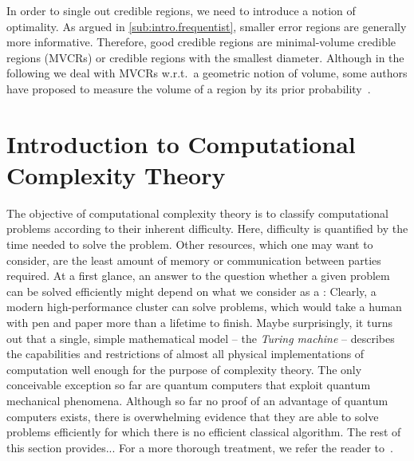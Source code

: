 In order to single out  credible regions, we need to introduce a notion of optimality.
As argued in \cref{sub:intro.frequentist}, smaller error regions are generally more informative.
Therefore, good credible regions are minimal-volume credible regions (MVCRs) or credible regions with the smallest diameter.
Although in the following we deal with MVCRs w.r.t.\ a geometric notion of volume, some authors have proposed to measure the volume of a region by its prior probability~\cite{Evans_2006_Optimally,Shang_2013_Optimal}.






\section{Introduction to Computational Complexity Theory}
\label{sec:intro.complexity}


The objective of computational complexity theory is to classify computational problems according to their inherent difficulty.
Here, difficulty is quantified by the time needed to solve the problem.
Other resources, which one may want to consider, are the least amount of memory or communication between parties required.
At a first glance, an answer to the question whether a given problem can be solved efficiently might depend on what we consider as a :
Clearly, a modern high-performance cluster can solve problems, which would take a human with pen and paper more than a lifetime to finish.
Maybe surprisingly, it turns out that a single, simple mathematical model -- the \emph{Turing machine} -- describes the capabilities and restrictions of almost all physical implementations of computation well enough for the purpose of complexity theory.
The only conceivable exception so far are quantum computers that exploit quantum mechanical phenomena.
Although so far no proof of an advantage of quantum computers exists, there is overwhelming evidence that they are able to solve problems efficiently for which there is no efficient classical algorithm.
The rest of this section provides...
For a more thorough treatment, we refer the reader to~\cite{Arora_2009_Computational}.


